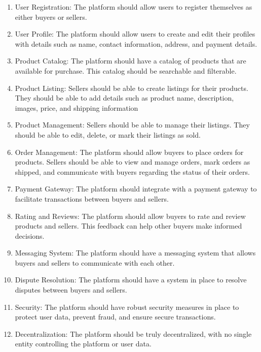 \documentclass{report}
\begin{document}
\begin{enumerate}
        \item User Registration: The platform should allow users to register themselves as either buyers or sellers. \\
    
    \item User Profile: The platform should allow users to create and edit their profiles with details such as name, contact information, address, and payment details. \\

    \item  Product Catalog: The platform should have a catalog of products that are available for purchase. This catalog should be searchable and filterable.

\item Product Listing: Sellers should be able to create listings for their products. They should be able to add details such as product name, description, images, price, and shipping information
\item Product Management: Sellers should be able to manage their listings. They should be able to edit, delete, or mark their listings as sold.
\item Order Management: The platform should allow buyers to place orders for products. Sellers should be able to view and manage orders, mark orders as shipped, and communicate with buyers regarding the status of their orders.
\item Payment Gateway: The platform should integrate with a payment gateway to facilitate transactions between buyers and sellers.
\item Rating and Reviews: The platform should allow buyers to rate and review products and sellers. This feedback can help other buyers make informed decisions.
\item Messaging System: The platform should have a messaging system that allows buyers and sellers to communicate with each other.
\item Dispute Resolution: The platform should have a system in place to resolve disputes between buyers and sellers.
\item Security: The platform should have robust security measures in place to protect user data, prevent fraud, and ensure secure transactions. 

\item Decentralization: The platform should be truly decentralized, with no single entity controlling the platform or user data.
\end{enumerate}
\end{document}
